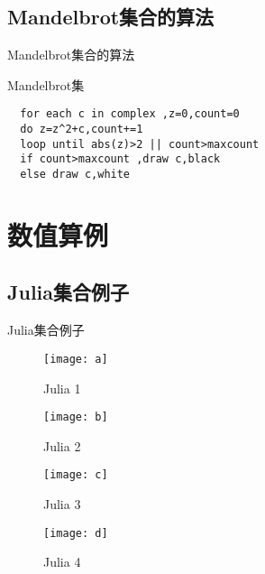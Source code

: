 \documentclass{beamer}
\begin{document}
\subsection{Mandelbrot集合的算法}
\begin{frame}[fragile]{Mandelbrot集合的算法}
  \begin{block}{Mandelbrot集}
\begin{verbatim}
  for each c in complex ,z=0,count=0
  do z=z^2+c,count+=1
  loop until abs(z)>2 || count>maxcount
  if count>maxcount ,draw c,black
  else draw c,white
\end{verbatim}
  \end{block}
\end{frame}

\section{数值算例}
\subsection{Julia集合例子}
\begin{frame}{Julia集合例子}
\begin{figure}[H]
  \centering
  \begin{minipage}[t]{0.48\textwidth}
    \centering
    \texttt{[image: a]}
    \caption{Julia 1}
  \end{minipage}
  \begin{minipage}[t]{0.48\textwidth}
    \centering
    \texttt{[image: b]}
    \caption{Julia 2}
  \end{minipage}
\end{figure}

\begin{figure}[H]
  \centering
  \begin{minipage}[t]{0.48\textwidth}
    \centering
    \texttt{[image: c]}
    \caption{Julia 3}
  \end{minipage}
  \begin{minipage}[t]{0.48\textwidth}
    \centering
    \texttt{[image: d]}
    \caption{Julia 4}
  \end{minipage}
\end{figure}  
\end{frame}
\end{document}
